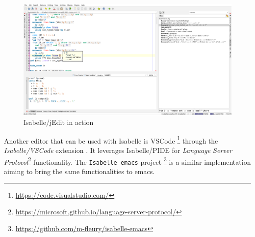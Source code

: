 \begin{figure}[htpb]
    \includegraphics[width=\textwidth]{images/jedit-plain.png}
    \caption[Isabelle/jEdit in action]{Isabelle/jEdit in action}\label{fig:jedit-plain}
\end{figure}

Another editor that can be used with Isabelle is VSCode \footnote{\url{https://code.visualstudio.com/}} through the \textit{Isabelle/VSCode}
extension \cite{isabelle-pide}. It leverages Isabelle/PIDE for 
\textit{Language Server Protocol}\footnote{\url{https://microsoft.github.io/language-server-protocol/}} functionality. The \texttt{Isabelle-emacs} project
\footnote{\url{https://github.com/m-fleury/isabelle-emacs}} is
a similar implementation aiming to bring the same functionalities to emacs.